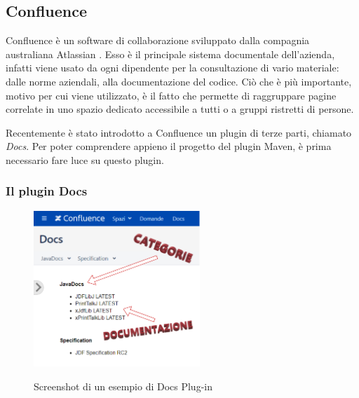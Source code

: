 

    \subsection{Confluence}
    Confluence è un software di collaborazione sviluppato dalla compagnia australiana Atlassian \cite{site:confluence}.
    Esso è il principale sistema documentale dell'azienda, infatti viene usato da ogni dipendente per la consultazione di vario materiale: dalle norme aziendali, alla documentazione del codice.
    Ciò che è più importante, motivo per cui viene utilizzato, è il fatto che permette di raggruppare pagine correlate in uno spazio dedicato accessibile a tutti o a gruppi ristretti di persone.
    
    Recentemente è stato introdotto a Confluence un plugin di terze parti, chiamato \emph{Docs}. 
    Per poter comprendere appieno il progetto del plugin Maven, è prima necessario fare luce su questo plugin.

    \subsubsection{Il plugin Docs} \label{pluginDocs}

    \begin{figure}[H]
        \centering
        \includegraphics[width=0.56\textwidth]{immagini/docs-conf.png}\\
        \caption{Screenshot di un esempio di Docs Plug-in}
        \label{screenDocs}
    \end{figure}

